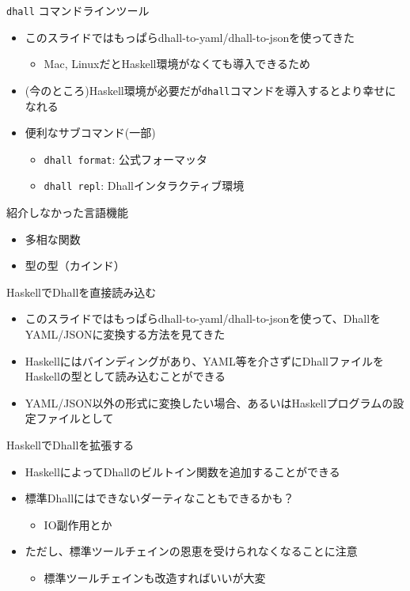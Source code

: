 \documentclass[unicode,12pt]{beamer}
\begin{document}
\begin{frame}{\texttt{dhall} コマンドラインツール}
  \begin{itemize}
  \item このスライドではもっぱらdhall-to-yaml/dhall-to-jsonを使ってきた
    \begin{itemize}
    \item Mac, LinuxだとHaskell環境がなくても導入できるため
    \end{itemize}
  \item (今のところ)Haskell環境が必要だが\texttt{dhall}コマンドを導入するとより幸せになれる
  \item 便利なサブコマンド(一部)
    \begin{itemize}
    \item \texttt{dhall format}: 公式フォーマッタ
    \item \texttt{dhall repl}: Dhallインタラクティブ環境
    \end{itemize}
  \end{itemize}
\end{frame}

\begin{frame}{紹介しなかった言語機能}
  \begin{itemize}
    \item 多相な関数
    \item 型の型（カインド）
  \end{itemize}
\end{frame}

\begin{frame}{HaskellでDhallを直接読み込む}
  \begin{itemize}
  \item このスライドではもっぱらdhall-to-yaml/dhall-to-jsonを使って、DhallをYAML/JSONに変換する方法を見てきた
  \item Haskellにはバインディングがあり、YAML等を介さずにDhallファイルをHaskellの型として読み込むことができる
  \item YAML/JSON以外の形式に変換したい場合、あるいはHaskellプログラムの設定ファイルとして
  \end{itemize}
\end{frame}

\begin{frame}{HaskellでDhallを拡張する}
  \begin{itemize}
  \item HaskellによってDhallのビルトイン関数を追加することができる
  \item 標準Dhallにはできないダーティなこともできるかも？
    \begin{itemize}
    \item IO副作用とか
    \end{itemize}
  \item ただし、標準ツールチェインの恩恵を受けられなくなることに注意
    \begin{itemize}
    \item 標準ツールチェインも改造すればいいが大変
    \end{itemize}
  \end{itemize}
\end{frame}
\end{document}
